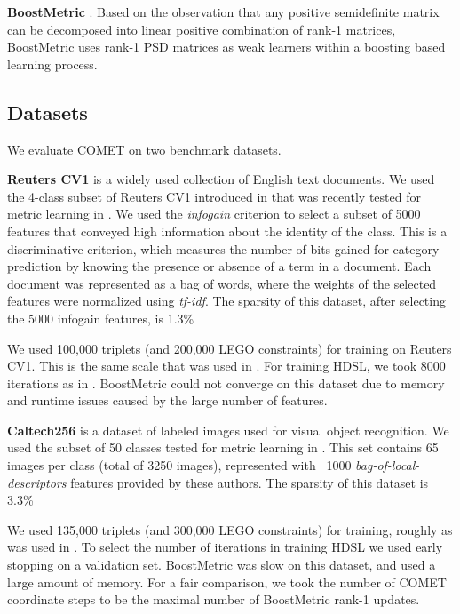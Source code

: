 \documentclass{article}
\begin{document}
\textbf{BoostMetric} \cite{boost}. Based on the observation that any positive semidefinite matrix can be decomposed into linear positive combination of rank-1 matrices, BoostMetric uses rank-1 PSD matrices as weak learners within a boosting based learning process.


\subsection{Datasets}
We evaluate COMET on two benchmark datasets.

\textbf{Reuters CV1} is a widely used collection of English text documents. We used the 4-class subset of Reuters CV1 introduced in \cite{CaiRCV14} that was recently tested for metric learning in \cite{hdsl}. We used the \textit{infogain} criterion \cite{infogain} to select a subset of 5000 features that conveyed high information about the identity of the class. This is a discriminative criterion, which measures the number of bits gained for category prediction by knowing the presence or absence of a term in a document. Each document was represented as a bag of words, where the weights of the selected features were normalized using \textit{tf-idf}. The sparsity of this dataset, after selecting the 5000 infogain features, is 1.3\%

We used 100,000 triplets (and 200,000 LEGO constraints) for training on Reuters CV1. This is the same scale that was used in \cite{hdsl}. For training HDSL, we took 8000 iterations as in \cite{hdsl}. BoostMetric could not converge on this dataset due to memory and runtime issues caused by the large number of features.

\textbf{Caltech256} is a dataset of labeled images used for visual object recognition. We used the subset of 50 classes tested for metric learning in \cite{OASIS}. This set contains 65 images per class (total of 3250 images), represented with ~1000 \textit{bag-of-local-descriptors} features provided by these authors. The sparsity of this dataset is 3.3\%

We used 135,000 triplets (and 300,000 LEGO constraints) for training, roughly as was used in \cite{OASIS}. To select the number of iterations in training HDSL we used early stopping on a validation set. BoostMetric was slow on this dataset, and used a large amount of memory. For a fair comparison, we took the number of COMET coordinate steps to be the maximal number of BoostMetric rank-1 updates.
\end{document}
